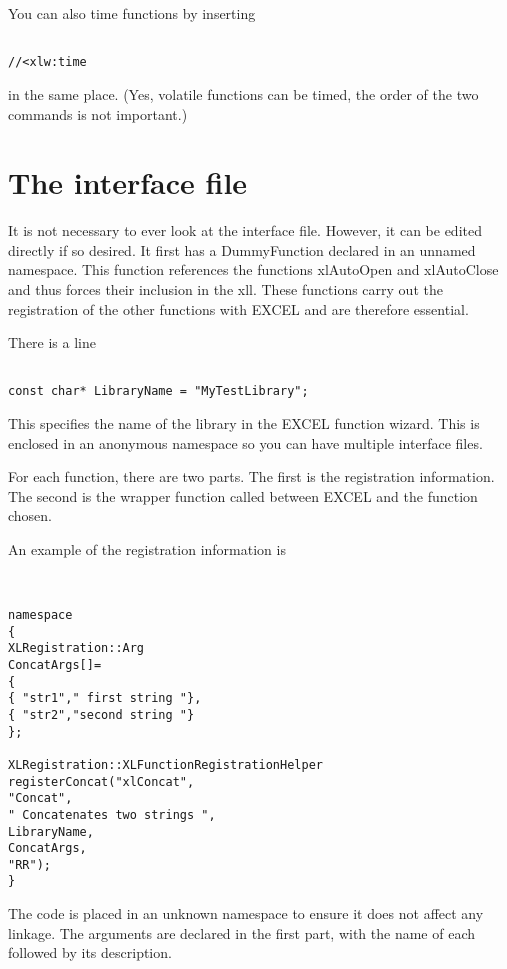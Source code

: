 \documentclass[12pt,reqno]{amsart}
\numberwithin{equation}{section}
\numberwithin{figure}{section}
\begin{document}
You can also time functions by inserting 
\begin{verbatim}

//<xlw:time

\end{verbatim}
in the same place. (Yes, volatile functions can be timed, the order of
the two commands is not important.)


\section{The interface file}

It is not necessary to ever look at the interface file. However, it
can be edited directly if so desired. It first has a DummyFunction
declared in an unnamed namespace. This function references the
functions xlAutoOpen and xlAutoClose and thus forces their inclusion
in the xll. These functions carry out the registration of the other
functions with EXCEL and are therefore essential. 

There is a line
\begin{verbatim}

const char* LibraryName = "MyTestLibrary";

\end{verbatim}
This specifies the name of the library in the EXCEL function
wizard. This is enclosed in an anonymous namespace so you can have
multiple interface files. 

For each function, there are two parts. The first is the registration
information. The second is the wrapper function called between EXCEL
and the function chosen. 

An example of the registration information is 
\begin{verbatim}


namespace
{
XLRegistration::Arg
ConcatArgs[]=
{
{ "str1"," first string "},
{ "str2","second string "}
};
  
XLRegistration::XLFunctionRegistrationHelper
registerConcat("xlConcat",
"Concat",
" Concatenates two strings ",
LibraryName,
ConcatArgs,
"RR");
}

\end{verbatim}

The code is placed in an unknown namespace to ensure it does not
affect any linkage. The arguments are declared in the first part, with
the name of each followed by its description. 
\end{document}
